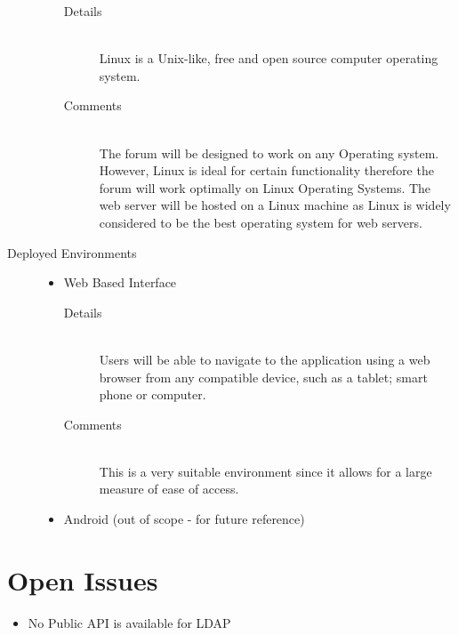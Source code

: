 \documentclass[10pt]{article}
\begin{document}
\begin{description}
\begin{itemize}
\begin{description}
						\item[Details] \hfill \\ 
                                                        Linux is a Unix-like, free and open source computer operating system.
						\item[Comments]\hfill \\
                                                        The forum will  be designed to work on any Operating system. However, Linux is ideal for certain functionality therefore the forum will work optimally on Linux Operating Systems. The web server will be hosted on a Linux machine as Linux is widely considered to be the best operating system  for web servers.
					\end{description}
			\end{itemize}	
		\item[Deployed Environments] \hfill 
			\begin{itemize}
				\item Web Based Interface
					\begin{description}
						\item[Details] \hfill \\
							Users will be able to navigate to the application using a web browser from any compatible device, such as a tablet; smart phone or computer.
						\item[Comments]\hfill \\
							This is a very suitable environment since it allows for a large measure of ease of access.
					\end{description}
				\item Android (out of scope - for future reference)

			\end{itemize}
\end{description}	
\section{Open Issues}
\begin{itemize}
\item No Public API is available for LDAP
\end{itemize}
\end{document}
